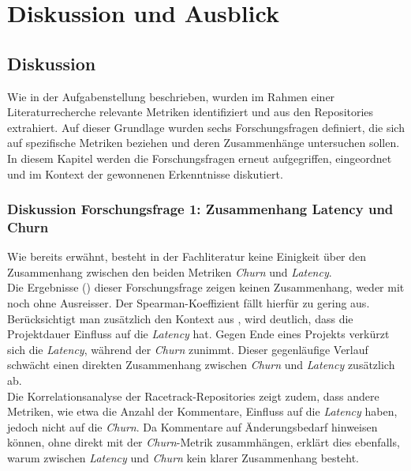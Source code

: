 


\chapter{Diskussion und Ausblick} %

\label{Chapter5} %


\section{Diskussion}

Wie in der Aufgabenstellung beschrieben, wurden im Rahmen einer Literaturrecherche relevante Metriken identifiziert und aus den Repositories extrahiert. Auf dieser Grundlage wurden sechs Forschungsfragen definiert, die sich auf spezifische Metriken beziehen und deren Zusammenhänge untersuchen sollen. In diesem Kapitel werden die Forschungsfragen erneut aufgegriffen, eingeordnet und im Kontext der gewonnenen Erkenntnisse diskutiert.


\subsection{Diskussion Forschungsfrage 1: Zusammenhang Latency und Churn}
Wie bereits erwähnt, besteht in der Fachliteratur keine Einigkeit über den Zusammenhang zwischen den beiden Metriken \textit{Churn} und \textit{Latency}. \\
Die Ergebnisse () dieser Forschungsfrage zeigen keinen Zusammenhang, weder mit noch ohne Ausreisser. Der Spearman-Koeffizient fällt hierfür zu gering aus. \\
Berücksichtigt man zusätzlich den Kontext aus , wird deutlich, dass die Projektdauer Einfluss auf die \textit{Latency} hat. Gegen Ende eines Projekts verkürzt sich die \textit{Latency}, während der \textit{Churn} zunimmt. Dieser gegenläufige Verlauf schwächt einen direkten Zusammenhang zwischen \textit{Churn} und \textit{Latency} zusätzlich ab. \\
Die Korrelationsanalyse der Racetrack-Repositories zeigt zudem, dass andere Metriken, wie etwa die Anzahl der Kommentare, Einfluss auf die \textit{Latency} haben, jedoch nicht auf die \textit{Churn}. Da Kommentare auf Änderungsbedarf hinweisen können, ohne direkt mit der \textit{Churn}-Metrik zusammhängen, erklärt dies ebenfalls, warum zwischen \textit{Latency} und \textit{Churn} kein klarer Zusammenhang besteht. 

